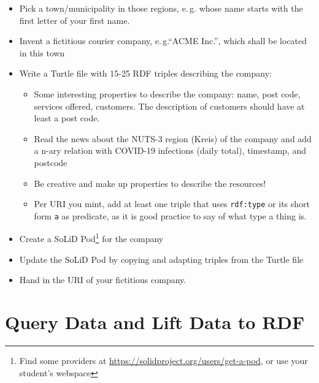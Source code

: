 \documentclass[DIV=12]{scrartcl}
\makeatletter
\newcommand{\eg}{e.\,g.\@\xspace}
\makeatother
\begin{document}
\begin{itemize}
\item Pick a town/municipality in those regions, \eg whose name starts with the first letter of your first name.
\item Invent a fictitious courier company, \eg \enquote{ACME Inc.}, which shall be located in this town
\item Write a Turtle file with 15-25 RDF triples describing the company:
\begin{itemize}
\item Some interesting properties to describe the company: name, post code, services offered, customers. The description of customers should have at least a post code.
\item Read the news about the NUTS-3 region (Kreis) of the company and add a n-ary relation with COVID-19 infections (daily total), timestamp, and postcode
\item Be creative and make up properties to describe the resources!
\item Per URI you mint, add at least one triple that uses \nolinkurl{rdf:type} or its short form \nolinkurl{a} as predicate, as it is good practice to say of what type a thing is.
\end{itemize}
\item Create a SoLiD Pod\footnote{Find some providers at \url{https://solidproject.org/users/get-a-pod}, or use your student's webspace} for the company
\item Update the SoLiD Pod by copying and adapting triples from the Turtle file
\item Hand in the URI of your fictitious company.
\end{itemize}


\section{Query Data and Lift Data to RDF}
\end{document}
